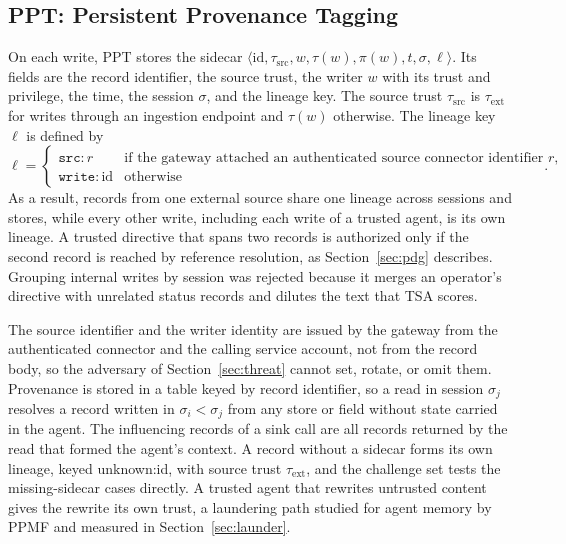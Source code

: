 \documentclass[applsci,article,submit,moreauthors]{Definitions/mdpi}
\begin{document}
\subsection{PPT: Persistent Provenance Tagging}
\label{sec:ppt}
On each write, PPT stores the sidecar $\langle \mathrm{id}, \tau_{\mathrm{src}}, w, \tau(w), \pi(w), t, \sigma, \ell\rangle$. Its fields are the record identifier, the source trust, the writer $w$ with its trust and privilege, the time, the session $\sigma$, and the lineage key. The source trust $\tau_{\mathrm{src}}$ is $\tau_{\mathrm{ext}}$ for writes through an ingestion endpoint and $\tau(w)$ otherwise. The lineage key $\ell$ is defined by
\begin{equation}
\ell =
\begin{cases}
\texttt{src:}\,r & \text{if the gateway attached an authenticated source connector identifier } r,\\
\texttt{write:}\,\mathrm{id} & \text{otherwise}
\end{cases}.
\label{eq:lineage}
\end{equation}
As a result, records from one external source share one lineage across sessions and stores, while every other write, including each write of a trusted agent, is its own lineage. A trusted directive that spans two records is authorized only if the second record is reached by reference resolution, as Section~\ref{sec:pdg} describes. Grouping internal writes by session was rejected because it merges an operator's directive with unrelated status records and dilutes the text that TSA scores.

The source identifier and the writer identity are issued by the gateway from the authenticated connector and the calling service account, not from the record body, so the adversary of Section~\ref{sec:threat} cannot set, rotate, or omit them. Provenance is stored in a table keyed by record identifier, so a read in session $\sigma_j$ resolves a record written in $\sigma_i<\sigma_j$ from any store or field without state carried in the agent. The influencing records of a sink call are all records returned by the read that formed the agent's context. A record without a sidecar forms its own lineage, keyed unknown:id, with source trust $\tau_{\mathrm{ext}}$, and the challenge set tests the missing-sidecar cases directly. A trusted agent that rewrites untrusted content gives the rewrite its own trust, a laundering path studied for agent memory by PPMF \cite{xu2026ppmf} and measured in Section~\ref{sec:launder}.
\end{document}
